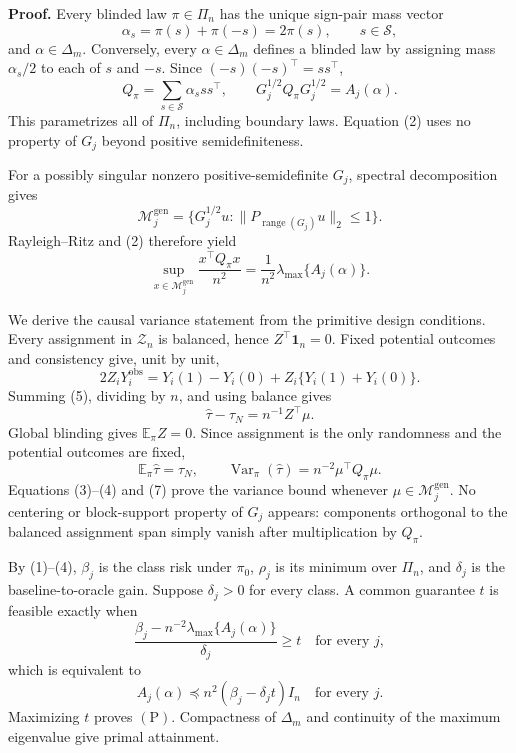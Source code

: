 \textbf{Proof.}
Every blinded law \(\pi\in\Pi_n\) has the unique sign-pair mass vector
\[
\alpha_s=\pi(s)+\pi(-s)=2\pi(s),
\qquad s\in\mathscr S,
\tag{1}
\]
and \(\alpha\in\Delta_m\). Conversely, every \(\alpha\in\Delta_m\) defines a blinded law by assigning mass \(\alpha_s/2\) to each of \(s\) and \(-s\). Since \((-s)(-s)^\top=ss^\top\),
\[
Q_\pi=\sum_{s\in\mathscr S}\alpha_sss^\top,
\qquad
G_j^{1/2}Q_\pi G_j^{1/2}=A_j(\alpha).
\tag{2}
\]
This parametrizes all of \(\Pi_n\), including boundary laws.  Equation (2) uses no property of \(G_j\) beyond positive semidefiniteness.

For a possibly singular nonzero positive-semidefinite \(G_j\), spectral decomposition gives
\[
\mathcal M_j^{\mathrm{gen}}
=\{G_j^{1/2}u:\|P_{\operatorname{range}(G_j)}u\|_2\le1\}.
\tag{3}
\]
Rayleigh--Ritz and (2) therefore yield
\[
\sup_{x\in\mathcal M_j^{\mathrm{gen}}}
\frac{x^\top Q_\pi x}{n^2}
=\frac1{n^2}\lambda_{\max}\{A_j(\alpha)\}.
\tag{4}
\]

We derive the causal variance statement from the primitive design conditions.  Every assignment in \(\mathcal Z_n\) is balanced, hence \(Z^\top\mathbf1_n=0\).  Fixed potential outcomes and consistency give, unit by unit,
\[
2Z_iY_i^{\mathrm{obs}}
=Y_i(1)-Y_i(0)+Z_i\{Y_i(1)+Y_i(0)\}.
\tag{5}
\]
Summing (5), dividing by \(n\), and using balance gives
\[
\widehat\tau-\tau_N=n^{-1}Z^\top\mu.
\tag{6}
\]
Global blinding gives \(\mathbb E_\pi Z=0\).  Since assignment is the only randomness and the potential outcomes are fixed,
\[
\mathbb E_\pi\widehat\tau=\tau_N,
\qquad
\operatorname{Var}_\pi(\widehat\tau)
=n^{-2}\mu^\top Q_\pi\mu.
\tag{7}
\]
Equations (3)--(4) and (7) prove the variance bound whenever \(\mu\in\mathcal M_j^{\mathrm{gen}}\).  No centering or block-support property of \(G_j\) appears: components orthogonal to the balanced assignment span simply vanish after multiplication by \(Q_\pi\).

By (1)--(4), \(\beta_j\) is the class risk under \(\pi_0\), \(\rho_j\) is its minimum over \(\Pi_n\), and \(\delta_j\) is the baseline-to-oracle gain.  Suppose \(\delta_j>0\) for every class.  A common guarantee \(t\) is feasible exactly when
\[
\frac{\beta_j-n^{-2}\lambda_{\max}\{A_j(\alpha)\}}{\delta_j}\ge t
\quad\text{for every }j,
\tag{8}
\]
which is equivalent to
\[
A_j(\alpha)\preceq n^2(\beta_j-\delta_jt)I_n
\quad\text{for every }j.
\tag{9}
\]
Maximizing \(t\) proves \((\mathrm P)\).  Compactness of \(\Delta_m\) and continuity of the maximum eigenvalue give primal attainment.

